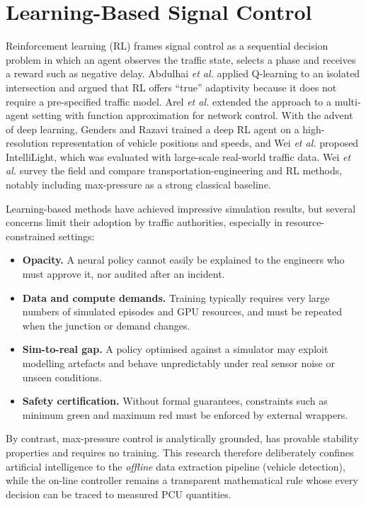 \section{Learning-Based Signal Control}\label{sec:lit-rl}
Reinforcement learning (RL) frames signal control as a sequential decision problem in which an agent observes the
traffic state, selects a phase and receives a reward such as negative delay. Abdulhai \emph{et al.}
\cite{abdulhai2003rl} applied Q-learning to an isolated intersection and argued that RL offers ``true''
adaptivity because it does not require a pre-specified traffic model. Arel \emph{et al.} \cite{arel2010rl}
extended the approach to a multi-agent setting with function approximation for network control. With the advent
of deep learning, Genders and Razavi \cite{genders2016drl} trained a deep RL agent on a high-resolution
representation of vehicle positions and speeds, and Wei \emph{et al.} \cite{wei2018intellilight} proposed
IntelliLight, which was evaluated with large-scale real-world traffic data. Wei \emph{et al.} \cite{wei2019survey}
survey the field and compare transportation-engineering and RL methods, notably including max-pressure as a
strong classical baseline.

Learning-based methods have achieved impressive simulation results, but several concerns limit their adoption by
traffic authorities, especially in resource-constrained settings:
\begin{itemize}[leftmargin=*,itemsep=2pt]
  \item \textbf{Opacity.} A neural policy cannot easily be explained to the engineers who must approve it, nor
        audited after an incident.
  \item \textbf{Data and compute demands.} Training typically requires very large numbers of simulated episodes
        and GPU resources, and must be repeated when the junction or demand changes.
  \item \textbf{Sim-to-real gap.} A policy optimised against a simulator may exploit modelling artefacts and
        behave unpredictably under real sensor noise or unseen conditions.
  \item \textbf{Safety certification.} Without formal guarantees, constraints such as minimum green and maximum
        red must be enforced by external wrappers.
\end{itemize}
By contrast, max-pressure control is analytically grounded, has provable stability properties and requires no
training. This research therefore deliberately confines artificial intelligence to the \emph{offline} data
extraction pipeline (vehicle detection), while the on-line controller remains a transparent mathematical rule
whose every decision can be traced to measured PCU quantities.

